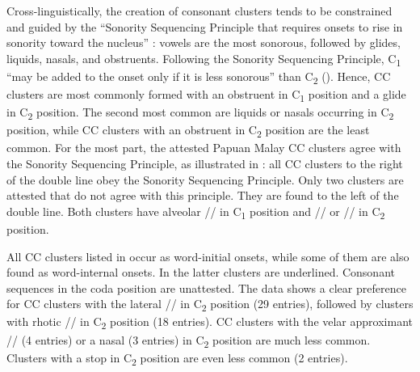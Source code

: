 Cross-linguistically, the creation of consonant clusters tends to be constrained and guided by the “Sonority Sequencing Principle that requires onsets to rise in sonority toward the nucleus” \citep[254]{Kenstowicz.1994}: vowels are the most sonorous, followed by glides, liquids, nasals, and obstruents. Following the Sonority Sequencing Principle, C\textsubscript{1} “may be added to the onset only if it is less sonorous” than C\textsubscript{2} (\citeyear*[255]{Kenstowicz.1994}). Hence, CC clusters are most commonly formed with an obstruent in C\textsubscript{1} position and a glide in C\textsubscript{2} position. The second most common are liquids or nasals occurring in C\textsubscript{2} position, while CC clusters with an obstruent in C\textsubscript{2} position are the least common. For the most part, the attested Papuan Malay CC clusters agree with the Sonority Sequencing Principle, as illustrated in : all CC clusters to the right of the double line obey the Sonority Sequencing Principle. Only two clusters are attested that do not agree with this principle. They are found to the left of the double line. Both clusters have alveolar // in C\textsubscript{1} position and // or // in C\textsubscript{2} position.



All CC clusters listed in  occur as word-initial onsets, while some of them are also found as word-internal onsets. In  the latter clusters are underlined. Consonant sequences in the coda position are unattested. The data shows a clear preference for CC clusters with the lateral // in C\textsubscript{2} position (29 entries), followed by clusters with rhotic // in C\textsubscript{2} position (18 entries). CC clusters with the velar approximant // (4 entries) or a nasal (3 entries) in C\textsubscript{2} position are much less common. Clusters with a stop in C\textsubscript{2} position are even less common (2 entries).

